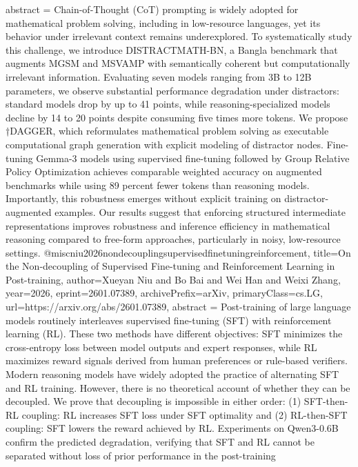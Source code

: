 {      abstract = {Chain-of-Thought (CoT) prompting is widely adopted for mathematical problem solving, including in low-resource languages, yet its behavior under irrelevant context remains underexplored. To systematically study this challenge, we introduce DISTRACTMATH-BN, a Bangla benchmark that augments MGSM and MSVAMP with semantically coherent but computationally irrelevant information. Evaluating seven models ranging from 3B to 12B parameters, we observe substantial performance degradation under distractors: standard models drop by up to 41 points, while reasoning-specialized models decline by 14 to 20 points despite consuming five times more tokens. We propose †DAGGER, which reformulates mathematical problem solving as executable computational graph generation with explicit modeling of distractor nodes. Fine-tuning Gemma-3 models using supervised fine-tuning followed by Group Relative Policy Optimization achieves comparable weighted accuracy on augmented benchmarks while using 89 percent fewer tokens than reasoning models. Importantly, this robustness emerges without explicit training on distractor-augmented examples. Our results suggest that enforcing structured intermediate representations improves robustness and inference efficiency in mathematical reasoning compared to free-form approaches, particularly in noisy, low-resource settings.}
}@misc{niu2026nondecouplingsupervisedfinetuningreinforcement,
      title={On the Non-decoupling of Supervised Fine-tuning and Reinforcement Learning in Post-training}, 
      author={Xueyan Niu and Bo Bai and Wei Han and Weixi Zhang},
      year={2026},
      eprint={2601.07389},
      archivePrefix={arXiv},
      primaryClass={cs.LG},
      url={https://arxiv.org/abs/2601.07389},
      abstract = {Post-training of large language models routinely interleaves supervised fine-tuning (SFT) with reinforcement learning (RL). These two methods have different objectives: SFT minimizes the cross-entropy loss between model outputs and expert responses, while RL maximizes reward signals derived from human preferences or rule-based verifiers. Modern reasoning models have widely adopted the practice of alternating SFT and RL training. However, there is no theoretical account of whether they can be decoupled. We prove that decoupling is impossible in either order: (1) SFT-then-RL coupling: RL increases SFT loss under SFT optimality and (2) RL-then-SFT coupling: SFT lowers the reward achieved by RL. Experiments on Qwen3-0.6B confirm the predicted degradation, verifying that SFT and RL cannot be separated without loss of prior performance in the post-training}
}
